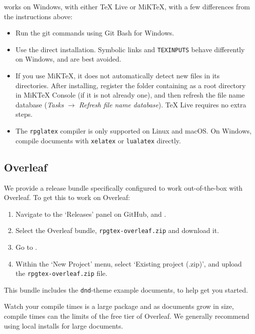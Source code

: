 			\rpgtex{} works on Windows, with either TeX Live or MiKTeX, with a few differences from the instructions above:
			\begin{itemize}
				\item Run the git commands using Git Bash for Windows.
				\item Use the direct installation. Symbolic links and \texttt{TEXINPUTS} behave differently on Windows, and are best avoided.
				\item If you use MiKTeX, it does not automatically detect new files in its directories. After installing, register the folder containing \rpgtex{} as a root directory in MiKTeX Console (if it is not already one), and then refresh the file name database (\textit{Tasks} $\rightarrow$ \textit{Refresh file name database}). TeX Live requires no extra steps.
				\item The \texttt{rpglatex} compiler  is only supported on Linux and macOS. On Windows, compile documents with \texttt{xelatex} or \texttt{lualatex} directly.
			\end{itemize}

		\subsection{Overleaf}

			We provide a release bundle specifically configured to work out-of-the-box with Overleaf. To get this to work on Overleaf:
			\begin{enumerate}[leftmargin=1cm]
				\item Navigate to the `Releases' panel on GitHub, and .
				\item Select the Overleaf bundle, \texttt{rpgtex-overleaf.zip} and download it.
				\item Go to .
				\item Within the `New Project' menu, select `Existing project (.zip)', and upload the \texttt{rpgtex-overleaf.zip} file.
			\end{enumerate}

			This bundle includes the \texttt{dnd}-theme example documents, to help get you started.

			\begin{RpgTip}{Watch your compile times}
				\rpgtex{} is a large package and as documents grow in size, compile times can the limits of the free tier of Overleaf. We generally recommend using local installs for large documents.
			\end{RpgTip}


